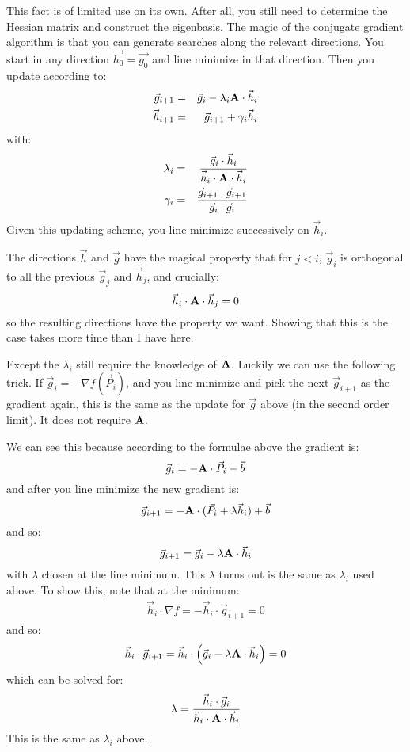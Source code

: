 This fact is of limited use on its own. After all, you still need to
determine the Hessian matrix and construct the eigenbasis. The magic
of the conjugate gradient algorithm is that you can generate searches
along the relevant directions. You start in any direction
$\vec{h_0}=\vec{g_0}$ and line minimize in that direction. Then you
update according to:
\begin{eqnarray}
\vec{g}_{i+1} &=& \vec{g}_i - \lambda_i {\bf A}\cdot\vec{h}_i \cr
\vec{h}_{i+1} &=& \vec{g}_{i+1} + \gamma_i \vec{h}_i 
\end{eqnarray}
with:
\begin{eqnarray}
\lambda_i &=& \frac{\vec{g}_i \cdot
  \vec{h}_i}{\vec{h}_i\cdot{\bf A}\cdot\vec{h}_i} \cr
\gamma_i &=& \frac{\vec{g}_{i+1} \cdot
  \vec{g}_{i+1}}{\vec{g}_i\cdot\vec{g}_i}
\end{eqnarray}
Given this updating scheme, you line minimize successively on
$\vec{h}_i$. 

The directions $\vec{h}$ and $\vec{g}$ have the magical
property that for $j<i$, $\vec{g}_i$ is orthogonal to all the previous
$\vec{g}_j$ and $\vec{h}_j$, and crucially:
\begin{equation}
\vec{h}_i \cdot {\bf A} \cdot \vec{h}_j = 0 
\end{equation}
so the resulting directions have the property we want. Showing that
this is the case takes more time than I have here. 

Except the $\lambda_i$ still require the knowledge of
${\bf A}$. Luckily we can use the following trick. If $\vec{g}_i = -
\nabla f(\vec{P}_i)$, and you line minimize and pick the next
$\vec{g}_{i+1}$ as the gradient again, this is the same as the update
for $\vec{g}$ above (in the second order limit). It does not require
${\bf A}$.

We can see this because according to the formulae above the gradient
is:
\begin{equation}
\vec{g}_i = - {\bf A}\cdot\vec{P}_i + \vec{b}
\end{equation}
and after you line minimize the new gradient is:
\begin{equation}
\vec{g}_{i+1} = - {\bf A}\cdot (\vec{P}_i + \lambda \vec{h}_i) + \vec{b}
\end{equation}
and so:
\begin{equation}
\vec{g}_{i+1} = \vec{g}_i - \lambda {\bf A}\cdot\vec{h}_i
\end{equation}
with $\lambda$ chosen at the line minimum.  This $\lambda$ turns out
is the same as $\lambda_i$ used above. To show this, note that at the
minimum:
\begin{eqnarray}
  \vec{h}_i \cdot \nabla f = -\vec{h}_i \cdot \vec{g}_{i+1}  = 0
\end{eqnarray}
and so:
\begin{equation}
  \vec{h}_i \cdot \vec{g}_{i+1} = 
    \vec{h}_i \cdot \left(\vec{g}_i
    - \lambda {\bf A}\cdot\vec{h}_i\right) = 0
\end{equation}
which can be solved for:
\begin{equation}
\lambda
= \frac{\vec{h}_i \cdot \vec{g}_i}{\vec{h}_i \cdot{\bf A}\cdot\vec{h}_i}
\end{equation}
This is the same as $\lambda_i$ above.

